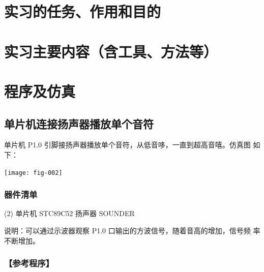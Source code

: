 \documentclass{swfulabreport}
\begin{document}
\maketitle %

\section{实习的任务、作用和目的}

\zhlipsum[1-3]

\section{实习主要内容（含工具、方法等）}

\zhlipsum[4-6]

\section{程序及仿真}

\subsection{单片机连接扬声器播放单个音符}

单片机 P1.0 引脚接扬声器播放单个音符，从低音哆，一直到超高音嘻。仿真图
如下：

\begin{center}
  \texttt{[image: fig-002]}
\end{center}

\subsubsection{器件清单}

\begin{tasks}(2)
  \task 单片机 STC89C52
  \task 扬声器 SOUNDER
\end{tasks}

说明：可以通过示波器观察 P1.0 口输出的方波信号，随着音高的增加，信号频
率不断增加。

\subsubsection{【参考程序】}
\end{document}
